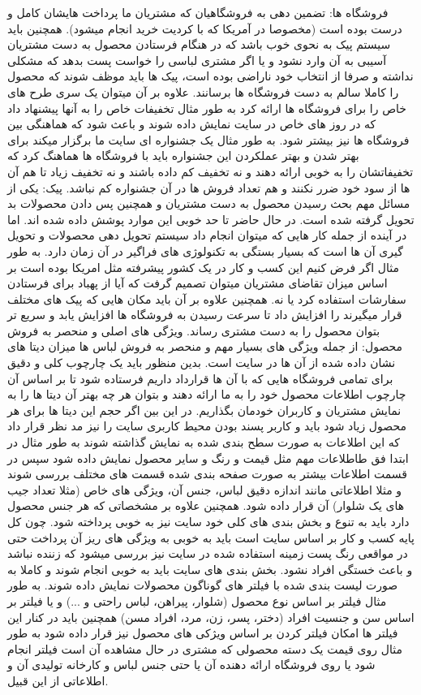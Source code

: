 \documentclass[12pt,a4paper]{article}
\begin{document}
	فروشگاه ها: تضمین دهی به فروشگاهیان که مشتریان ما پرداخت هایشان کامل و درست بوده است (مخصوصا در آمریکا که با کردیت خرید انجام میشود). همچنین باید سیستم پیک به نحوی خوب باشد که در هنگام فرستادن محصول به دست مشتریان آسیبی به آن وارد نشود و یا اگر مشتری لباسی را خواست پست بدهد که مشکلی نداشته و صرفا از انتخاب خود ناراضی بوده است، پیک ها باید موظف شوند که محصول را کاملا سالم به دست فروشگاه ها برسانند.
	علاوه بر آن میتوان یک سری طرح های خاص را برای فروشگاه ها ارائه کرد به طور مثال تخفیفات خاص را به آنها پیشنهاد داد که در روز های خاص در سایت نمایش داده شوند و باعث شود که هماهنگی بین فروشگاه ها نیز بیشتر شود. به طور مثال یک جشنواره ای سایت ما برگزار میکند برای بهتر شدن و بهتر عملکردن این جشنواره باید با فروشگاه ها هماهنگ کرد که تخفیفاتشان را به خوبی ارائه دهند و نه تخفیف کم داده باشند و نه تخفیف زیاد تا هم آن ها از سود خود ضرر نکنند و هم تعداد فروش ها در آن جشنواره کم نباشد.
	پیک: یکی از مسائل مهم بحث رسیدن محصول به دست مشتریان و همچنین پس دادن محصولات بد تحویل گرفته شده است. در حال حاضر تا حد خوبی این موارد پوشش داده شده اند. اما در آینده از جمله کار هایی که میتوان انجام داد سیستم تحویل دهی محصولات و تحویل گیری آن ها است که بسیار بستگی به تکنولوژی های فراگیر در آن زمان دارد. به طور مثال اگر فرض کنیم این کسب و کار در یک کشور پیشرفته مثل امریکا بوده است بر اساس میزان تقاضای مشتریان میتوان تصمیم گرفت که آیا از پهباد برای فرستادن سفارشات استفاده کرد یا نه.
	همچنین علاوه بر آن باید مکان هایی که پیک های مختلف قرار میگیرند را افزایش داد تا سرعت رسیدن به فروشگاه ها افزایش یابد و سریع تر بتوان محصول را به دست مشتری رساند.
	ویژگی های اصلی و منحصر به فروش محصول:
	از جمله ویژگی های بسیار مهم و منحصر به فروش لباس ها میزان دیتا های نشان داده شده از آن ها در سایت است. بدین منظور باید یک چارچوب کلی و دقیق برای تمامی فروشگاه هایی که با آن ها قرارداد داریم فرستاده شود تا بر اساس آن چارچوب اطلاعات محصول خود را به ما ارائه دهند و بتوان هر چه بهتر آن دیتا ها را به نمایش مشتریان و کاربران خودمان بگذاریم. در این بین اگر حجم این دیتا ها برای هر محصول زیاد شود باید  و کاربر پسند بودن محیط کاربری سایت را نیز مد نظر قرار داد که این اطلاعات به صورت سطح بندی شده به نمایش گذاشته شوند به طور مثال در ابتدا فق طاطلاعات مهم مثل قیمت و رنگ و سایر محصول نمایش داده شود سپس در قسمت اطلاعات بیشتر به صورت صفحه بندی شده قسمت های مختلف بررسی شوند و مثلا اطلاعاتی مانند اندازه دقیق لباس، جنس آن، ویژگی های خاص (مثلا تعداد جیب های یک شلوار) آن قرار داده شود.
	همچنین علاوه بر مشخصاتی که هر جنس محصول دارد باید به تنوع و بخش بندی های کلی خود سایت نیز به خوبی پرداخته شود. چون کل پایه کسب و کار بر اساس سایت است باید به خوبی به ویژگی های ریز آن پرداخت حتی در مواقعی رنگ پست زمینه استفاده شده در سایت نیز بررسی میشود که زننده نباشد و باعث خستگی افراد نشود.
	بخش بندی های سایت باید به خوبی انجام شوند و کاملا به صورت لیست بندی شده با فیلتر های گوناگون محصولات نمایش داده شوند. به طور مثال فیلتر بر اساس نوع محصول (شلوار، پیراهن، لباس راحتی و ...) و یا فیلتر بر اساس سن و جنسیت افراد (دختر، پسر، زن، مرد، افراد مسن) همچنین باید در کنار این فیلتر ها امکان فیلتر کردن بر اساس ویژکی های محصول نیز قرار داده شود به طور مثال روی قیمت یک دسته محصولی که مشتری در حال مشاهده آن است فیلتر انجام شود یا روی فروشگاه ارائه دهنده آن یا حتی جنس لباس و کارخانه تولیدی آن و اطلاعاتی از این قبیل.
	
	
	
	
\end{document}
